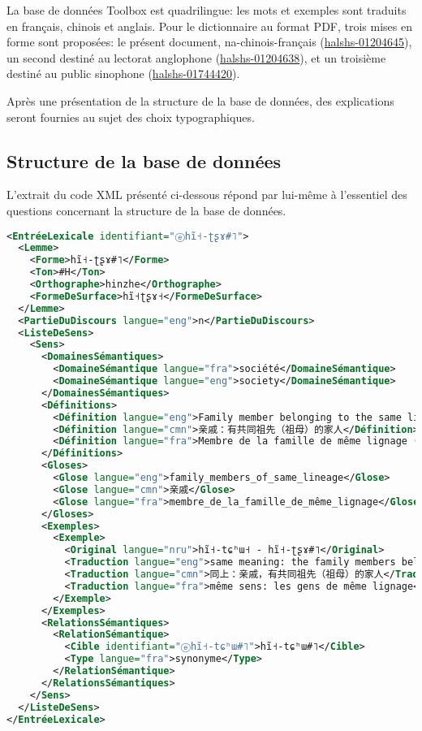 La base de données Toolbox est quadrilingue: les mots et exemples sont traduits en français, chinois et anglais. Pour le dictionnaire au format PDF, trois mises en forme sont proposées: le présent document, na-chinois-français (\hyperlink{https://shs.hal.science/halshs-01204645/}{halshs-01204645}), un second destiné au lectorat anglophone (\hyperlink{https://shs.hal.science/halshs-01204638}{halshs-01204638}), et un troisième destiné au public sinophone (\hyperlink{https://shs.hal.science/halshs-01744420}{halshs-01744420}).

Après une présentation de la structure de la base de données, des explications seront fournies au sujet des choix typographiques.

\subsection{Structure de la base de données}

L'extrait du code XML présenté ci-dessous répond par lui-même à l'essentiel des questions concernant la structure de la base de données.
\begin{lstlisting}[language=XML, caption=Extrait du code XML Lexika illustrant la structure des entrées, label=code:LexikaXML]
<EntréeLexicale identifiant="ⓔhĩ˧-ʈʂɤ#˥">
  <Lemme>
    <Forme>hĩ˧-ʈʂɤ#˥</Forme>
    <Ton>#H</Ton>
    <Orthographe>hinzhe</Orthographe>
    <FormeDeSurface>hĩ˧ʈʂɤ˧</FormeDeSurface>
  </Lemme>
  <PartieDuDiscours langue="eng">n</PartieDuDiscours>
  <ListeDeSens>
    <Sens>
      <DomainesSémantiques>
        <DomaineSémantique langue="fra">société</DomaineSémantique>
        <DomaineSémantique langue="eng">society</DomaineSémantique>
      </DomainesSémantiques>
      <Définitions>
        <Définition langue="eng">Family member belonging to the same lineage (on the mother's side).</Définition>
        <Définition langue="cmn">亲戚：有共同祖先（祖母）的家人</Définition>
        <Définition langue="fra">Membre de la famille de même lignage (du côté maternel).</Définition>
      </Définitions>
      <Gloses>
        <Glose langue="eng">family_members_of_same_lineage</Glose>
        <Glose langue="cmn">亲戚</Glose>
        <Glose langue="fra">membre_de_la_famille_de_même_lignage</Glose>
      </Gloses>
      <Exemples>
        <Exemple>
          <Original langue="nru">hĩ˧-tɕʰɯ˧ - hĩ˧-ʈʂɤ#˥</Original>
          <Traduction langue="eng">same meaning: the family members belonging to the same lineage</Traduction>
          <Traduction langue="cmn">同上：亲戚，有共同祖先（祖母）的家人</Traduction>
          <Traduction langue="fra">même sens: les gens de même lignage</Traduction>
        </Exemple>
      </Exemples>
      <RelationsSémantiques>
        <RelationSémantique>
          <Cible identifiant="ⓔhĩ˧-tɕʰɯ#˥">hĩ˧-tɕʰɯ#˥</Cible>
          <Type langue="fra">synonyme</Type>
        </RelationSémantique>
      </RelationsSémantiques>
    </Sens>
  </ListeDeSens>
</EntréeLexicale>
\end{lstlisting}


